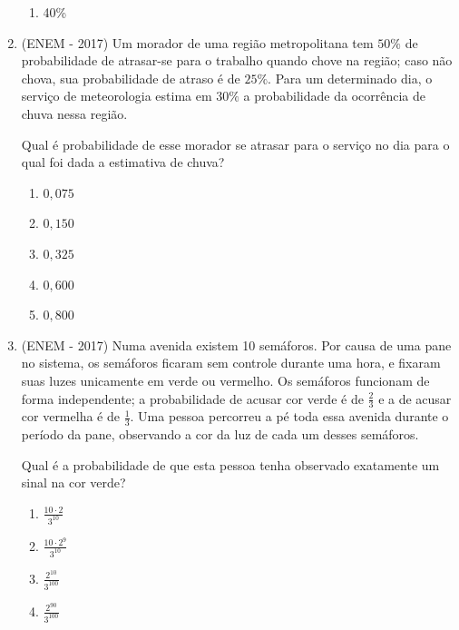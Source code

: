 \begin{enumerate}
\begin{enumerate}
\item {} 
40\%

\end{enumerate}

\item (ENEM - 2017) Um morador de uma região metropolitana tem $50\%$ de probabilidade de atrasar-se para o trabalho quando chove na região; caso não chova, sua probabilidade de atraso é de $25\%$. Para um determinado dia, o serviço de meteorologia estima em $30\%$ a probabilidade da ocorrência de chuva nessa região.

Qual é probabilidade de esse morador se atrasar para o serviço no dia para o qual foi dada a estimativa de chuva?
\begin{enumerate}
\item {} 
$0{,}075$

\item {} 
$0{,}150$

\item {} 
$0{,}325$

\item {} 
$0{,}600$

\item {} 
$0{,}800$

\end{enumerate}

\item (ENEM - 2017) Numa avenida existem 10 semáforos. Por causa de uma pane no sistema, os semáforos ficaram sem controle durante uma hora, e fixaram suas luzes unicamente em verde ou vermelho. Os semáforos funcionam de forma independente; a probabilidade de acusar cor verde é de \(\frac{2}{3}\) e a de acusar cor vermelha é de \(\frac{1}{3}\). Uma pessoa percorreu a pé toda essa avenida durante o período da pane, observando a cor da luz de cada um desses semáforos.

Qual é a probabilidade de que esta pessoa tenha observado exatamente um sinal na cor verde?
\begin{enumerate}
\item {} 
\(\displaystyle\frac{10\cdot 2}{3^{10}}\)

\item {} 
\(\displaystyle \frac{10\cdot 2^9}{3^{10}}\)

\item {} 
\(\displaystyle\frac{2^{10}}{3^{100}}\)

\item {} 
\(\displaystyle\frac{2^{90}}{3^{100}}\)


\end{enumerate}
\end{enumerate}

